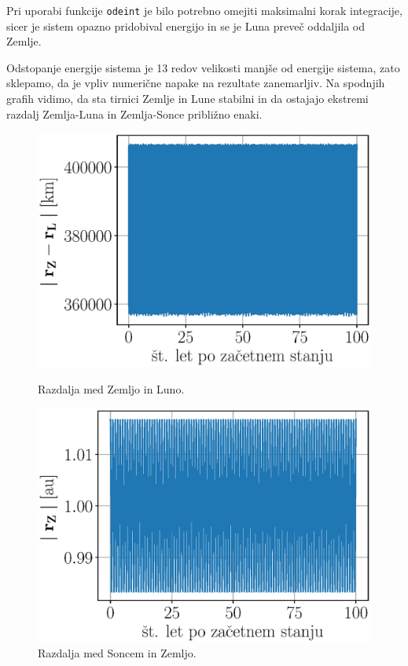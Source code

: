 \documentclass[a4paper,12pt]{article}
\begin{document}
\noindent
Pri uporabi funkcije \texttt{odeint} je bilo potrebno omejiti maksimalni
korak integracije, sicer je sistem opazno pridobival energijo in se je Luna
preveč oddaljila od Zemlje.

Odstopanje energije sistema je 13 redov velikosti manjše od energije sistema, 
zato sklepamo, da je vpliv numerične napake na rezultate zanemarljiv. Na 
spodnjih grafih vidimo, da sta tirnici Zemlje in Lune stabilni in da ostajajo 
ekstremi razdalj Zemlja-Luna in Zemlja-Sonce približno enaki.

\begin{figure}[h]
    \centering
    \begin{minipage}[t]{.5\textwidth}
        \centering
        \includegraphics[scale=0.45]{slikep/razdaljaZL.eps}
        \begin{minipage}{0.75\textwidth}
            \caption{Razdalja med Zemljo in Luno.}
        \end{minipage}%
    \end{minipage}%
    \hfill
    \begin{minipage}[t]{.5\textwidth}
        \centering
        \includegraphics[scale=0.45]{slikep/razdaljaSZ.eps}
        \begin{minipage}{0.75\textwidth}
            \caption{Razdalja med Soncem in Zemljo.}
        \end{minipage}
    \end{minipage}
\end{figure}
\end{document}

